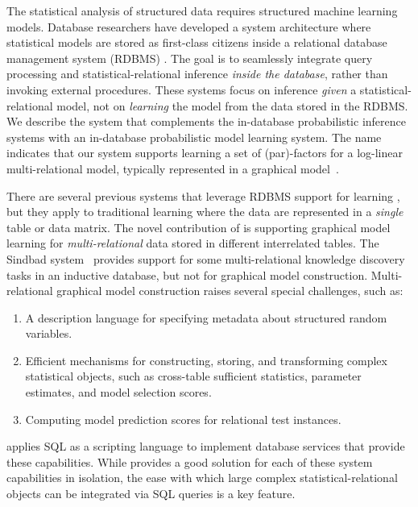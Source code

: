 \documentclass[letterpaper]{article}
\begin{document}
The statistical analysis of structured data requires structured machine learning models. Database researchers have developed a system architecture where statistical models are stored as first-class citizens inside a relational database management system (RDBMS) \cite{Wang2008,Niu2011}. The goal is to seamlessly integrate query processing and statistical-relational inference {\em inside the database}, rather than invoking external  procedures. 
These systems focus  on inference {\em given} a statistical-relational model, not on {\em learning} the model from the data stored in the RDBMS. 
We describe the \FB system that complements the in-database probabilistic inference systems with an in-database probabilistic model learning system. The name \FB indicates that our system supports learning a set of (par)-factors for a log-linear multi-relational model, typically represented in a graphical model~\cite{Kimmig2015}. 

There are several previous systems that leverage RDBMS support for learning \cite{MADlib_VLDB_2012,MLbase_ICDR_2013,Deshpande2006}, but they apply to traditional learning where the  data are represented in a {\em single} table or data matrix. The novel contribution of \FB is supporting graphical model learning for {\em multi-relational} data stored in different interrelated tables. The Sindbad system~\cite{Wicker2010} provides support for some multi-relational knowledge discovery tasks in an inductive database, but not for graphical model construction. Multi-relational graphical model construction raises several special challenges, such as:
\begin{enumerate}
\item A description language for specifying metadata about structured random variables.
\item Efficient mechanisms for constructing, storing, and transforming complex statistical objects, such as cross-table sufficient statistics, parameter estimates, and model selection scores.
\item Computing model prediction scores for relational test instances. 
\end{enumerate}



\FB applies SQL as a scripting language to implement database services that provide these capabilities. While \FB provides a good solution for each of these system capabilities in isolation, the ease with which large complex statistical-relational objects can be integrated via SQL queries is a key feature. 
\end{document}
